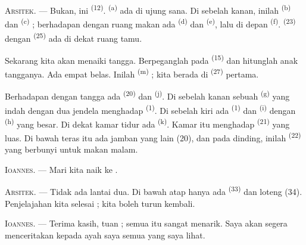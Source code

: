 \textsc{Arsitek}. --- Bukan, ini 
\textsuperscript{(12)}.  \textsuperscript{(a)} ada di
ujung sana. Di sebelah kanan, inilah 
\textsuperscript{(b)} dan  \textsuperscript{(c)} ;
berhadapan dengan ruang makan ada  \textsuperscript{(d)}
dan  \textsuperscript{(e)}, lalu di depan
 \textsuperscript{(f)}. 
\textsuperscript{(23)} dengan 
\textsuperscript{(25)} ada di dekat ruang tamu.

Sekarang kita akan menaiki tangga. Berpeganglah pada
 \textsuperscript{(15)} dan hitunglah anak
tangganya. Ada empat belas. Inilah 
\textsuperscript{(m)} ; kita berada di 
\textsuperscript{(27)} pertama.

\VUsaut{3.0mm}
\VUsaut{3.0mm}

Berhadapan dengan tangga ada  \textsuperscript{(20)} dan
 \textsuperscript{(j)}. Di sebelah kanan
sebuah  \textsuperscript{(g)} yang indah dengan dua
jendela menghadap  \textsuperscript{(1)}. Di sebelah
kiri ada  \textsuperscript{(1)} dan  \textsuperscript{(i)} dengan 
\textsuperscript{(h)} yang besar. Di dekat kamar tidur ada
 \textsuperscript{(k)}. Kamar itu menghadap
 \textsuperscript{(21)} yang luas. Di bawah teras itu ada
jamban yang lain (20), dan pada dinding, inilah 
\textsuperscript{(22)} yang berbunyi untuk makan malam.

\textsc{Ioannes}. --- Mari kita naik ke .

\textsc{Arsitek}. --- Tidak ada lantai dua. Di bawah atap hanya ada
 \textsuperscript{(33)} dan loteng (34).
Penjelajahan kita selesai ; kita boleh turun kembali.

\textsc{Ioannes}. --- Terima kasih, tuan ; semua itu sangat menarik.
Saya akan segera menceritakan kepada ayah saya semua yang saya lihat.

\VUsaut{4.0mm}
\VUfilet{22mm}
